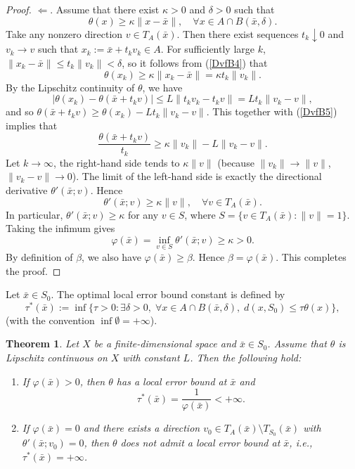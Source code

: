 \documentclass[11pt]{article}
\newtheorem{theorem}{Theorem}[section]
\begin{document}
\begin{proof}
	
	$ \Leftarrow $. 
	Assume that there exist $\kappa > 0$   and  $\delta > 0$ such that
	\begin{equation}\label{DvfB4}
		\theta(x) \ge \kappa \|x - \bar x\|,  \quad  \forall x \in A \cap B(\bar x, \delta).
	\end{equation}
	Take any nonzero direction $v \in T_A(\bar x)$.  
	Then there exist sequences $t_k \downarrow 0$ and $v_k \to v$ such that $x_k := \bar x + t_k v_k \in A$. For sufficiently large $k$, $\|x_k - \bar x\| \le t_k \|v_k\| < \delta$, so  it follows from  (\ref{DvfB4})  that
	\begin{equation}\label{DvfB5}
		\theta(x_k) \ge \kappa \|x_k - \bar x\| = \kappa t_k \|v_k\|.  
	\end{equation}
	By the Lipschitz continuity of $\theta$,  we have
	\[
	|\theta(x_k) - \theta(\bar x + t_k v)| \le L \|t_k v_k - t_k v\| = L t_k \|v_k - v\|,
	\]
	and so
	$ 	\theta(\bar x + t_k v) \ge \theta(x_k) - L t_k \|v_k - v\|. $
	This together with   (\ref{DvfB5})  implies that 
	\[
	\frac{\theta(\bar x + t_k v)}{t_k} \ge \kappa \|v_k\| - L \|v_k - v\|.
	\]
	Let  $k \to \infty$,  the right-hand side tends to $\kappa \|v\|$ (because $\|v_k\| \to \|v\|$, $\|v_k - v\| \to 0$). The limit of the left-hand side is exactly the directional derivative $\theta'(\bar x; v)$. Hence
	\[
	\theta'(\bar x; v) \ge \kappa \|v\|,   \quad  \forall v \in T_A(\bar x).
	\]
	In particular,  $\theta'(\bar x; v) \ge \kappa$ for any  $v \in S$, where $S = \{v \in T_A(\bar x) : \|v\| = 1\}$. Taking the infimum gives
	\[
	\varphi (\bar x) = \inf_{v \in S} \theta'(\bar x; v) \ge \kappa > 0.
	\]
	By definition of $\beta$, we also have $	\varphi (\bar x) \ge \beta$. Hence $\beta = 	\varphi (\bar x)$.  This completes the proof. 
\end{proof}  



Let  $\bar{x} \in S_0$.  The optimal local error bound constant is defined by 
\[
\tau^*(\bar{x}) := \inf\{ \tau > 0 : \exists \delta > 0,\; \forall x \in A \cap B(\bar{x}, \delta),\; d(x, S_0) \le \tau \theta(x) \},
\]
(with the convention $\inf \emptyset = +\infty$).



\begin{theorem}  \label{TYXWs}    Let $X$ be  a  finite-dimensional   space and  $\bar{x} \in S_0$.  Assume that $\theta$ is   Lipschitz continuous on $X$ with constant $L$.   
	Then the following hold:
	\begin{enumerate}
		\item[(i)]   If $	\varphi(\bar{x}) > 0$, then $\theta$ has a  local error bound at $\bar x$ and
		\[
		\tau^*(\bar{x}) = \frac{1}{	\varphi(\bar{x})} < +\infty.
		\]
		\item[(ii)] 	If $	\varphi(\bar{x}) = 0$ and there exists a direction $v_0\in T_A(\bar{x})\setminus T_{S_0}(\bar{x})$ with $\theta'(\bar{x};v_0)=0$, then $\theta$ does \emph{not} admit a local error bound at $\bar{x}$, i.e., $\tau^*(\bar{x}) = +\infty$.
	\end{enumerate}
\end{theorem}
\end{document}
